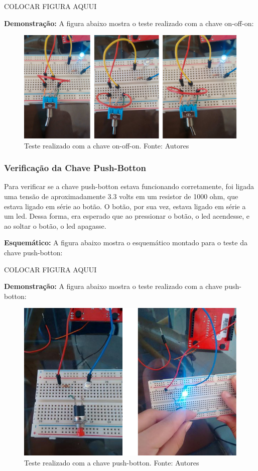 \documentclass[conference]{IEEEtran}
\begin{document}
COLOCAR FIGURA AQUUI

\textbf{Demonstração:}
A figura abaixo mostra o teste realizado com a chave on-off-on:
\begin{figure}
	\centering
	\includegraphics[width=0.7\linewidth]{on-off}
	\caption{Teste realizado com a chave on-off-on. Fonte: Autores}
	\label{fig:dem_on_off}
\end{figure}

\subsubsection{Verificação da Chave Push-Botton}
Para verificar se a chave push-botton estava funcionando corretamente, foi ligada uma tensão de aproximadamente 3.3 volts em um resistor de 1000 ohm, que estava ligado em série ao botão. O botão, por sua vez, estava ligado em série a um led. Dessa forma, era esperado que ao pressionar o botão, o led acendesse, e ao soltar o botão, o led apagasse. 

\textbf{Esquemático:}
A figura abaixo mostra o esquemático montado para o teste da chave push-botton:

COLOCAR FIGURA AQUUI

\textbf{Demonstração:}
A figura abaixo mostra o teste realizado com a chave push-botton:
\begin{figure}
	\centering
	\includegraphics[width=0.7\linewidth]{push-bottom}
	\caption{Teste realizado com a chave push-botton. Fonte: Autores}
	\label{fig:dem_push_botton}
\end{figure}
\end{document}
